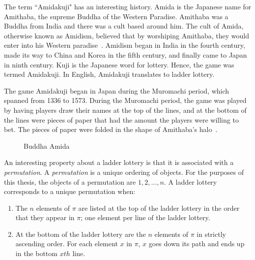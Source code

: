 The term ``Amidakuji" has an interesting history. Amida is the Japanese name 
for Amithaba, the supreme Buddha of the Western Paradise. Amithaba
was a Buddha from India and there was a cult based around him. The cult 
of Amida, otherwise known as Amidism, believed that by worshiping Amithaba, they would 
enter into his Western paradise~\cite{A0}. Amidism began in India in the fourth century,
made its way to China and Korea in the fifth century, and finally came 
to Japan in ninth century. Kuji is the Japanese word for lottery. Hence, the game 
was termed Amidakuji. In English, Amidakuji translates to ladder lottery.\par 
The game Amidakuji began in Japan during 
the Muromachi period, which spanned from
1336 to 1573. During the Muromachi period, the game was played by having
players draw their names at the top of the lines, and at the bottom 
of the lines were pieces of paper that had the amount the players
were willing to bet. The pieces of paper were folded in the shape of 
Amithaba's halo~\cite{A0}.
\begin{figure}[ht]
	\centering 
	\caption{Buddha Amida}
	\label{Fig:Amida}
\end{figure}

An interesting property about a ladder lottery is that it is  
associated with a \emph{permutation}. A \emph{permutation} is a unique ordering of objects. 
For the purposes of this thesis, the objects of a permutation are $1,2, \dots ,n$. 
A ladder lottery corresponds to a unique permutation when:
\begin{enumerate}
	\item The $n$ elements of $\pi$ are listed at the top of the ladder lottery in the order that they appear in 
	$\pi$; one element per line of the ladder lottery.
	\item At the bottom of the ladder lottery are the $n$ elements of $\pi$ in strictly ascending order. For 
	each element $x$ in $\pi$, $x$ goes down its path and ends up in the bottom $xth$ line. 
\end{enumerate} 

